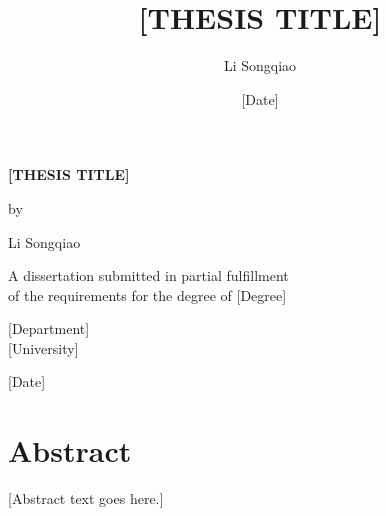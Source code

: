 \documentclass[12pt]{report}
\title{\textbf{[THESIS TITLE]}}
\author{Li Songqiao}
\date{[Date]}
\begin{document}
\begin{titlepage}
    \centering
    \vspace*{2cm}
    {\Huge\bfseries [THESIS TITLE]\par}
    \vspace{2cm}
    {\LARGE by\par}
    \vspace{1cm}
    {\LARGE Li Songqiao\par}
    \vspace{2cm}
    {\Large A dissertation submitted in partial fulfillment\\
     of the requirements for the degree of [Degree]\par}
    \vspace{2cm}
    {\Large [Department]\\{[University]}\par}
    \vfill
    {\Large [Date]\par}
\end{titlepage}

% 
\chapter*{Abstract}
[Abstract text goes here.]

\tableofcontents













% 
\end{document}
